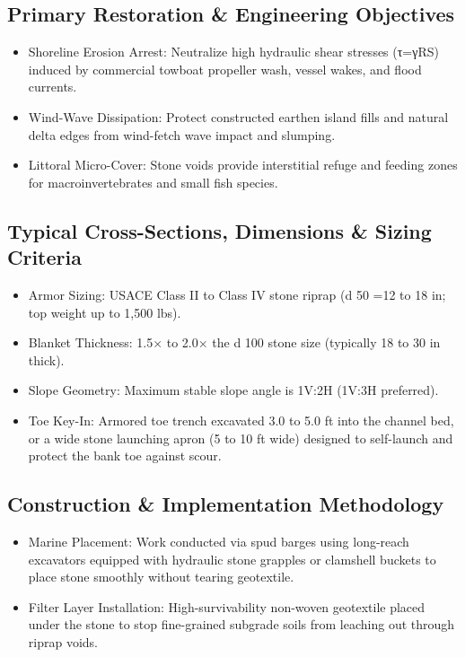 \documentclass[
  letterpaper,
  DIV=11,
  numbers=noendperiod]{scrreprt}
\begin{document}
\subsection{Primary Restoration \& Engineering
Objectives}\label{primary-restoration-engineering-objectives-10}

\begin{itemize}
\item
  Shoreline Erosion Arrest: Neutralize high hydraulic shear stresses
  (τ=γRS) induced by commercial towboat propeller wash, vessel wakes,
  and flood currents.
\item
  Wind-Wave Dissipation: Protect constructed earthen island fills and
  natural delta edges from wind-fetch wave impact and slumping.
\item
  Littoral Micro-Cover: Stone voids provide interstitial refuge and
  feeding zones for macroinvertebrates and small fish species.
\end{itemize}

\subsection{Typical Cross-Sections, Dimensions \& Sizing
Criteria}\label{typical-cross-sections-dimensions-sizing-criteria-8}

\begin{itemize}
\item
  Armor Sizing: USACE Class II to Class IV stone riprap (d 50 =12 to 18
  in; top weight up to 1,500 lbs).
\item
  Blanket Thickness: 1.5× to 2.0× the d 100 stone size (typically 18 to
  30 in thick).
\item
  Slope Geometry: Maximum stable slope angle is 1V:2H (1V:3H preferred).
\item
  Toe Key-In: Armored toe trench excavated 3.0 to 5.0 ft into the
  channel bed, or a wide stone launching apron (5 to 10 ft wide)
  designed to self-launch and protect the bank toe against scour.
\end{itemize}

\subsection{Construction \& Implementation
Methodology}\label{construction-implementation-methodology-11}

\begin{itemize}
\item
  Marine Placement: Work conducted via spud barges using long-reach
  excavators equipped with hydraulic stone grapples or clamshell buckets
  to place stone smoothly without tearing geotextile.
\item
  Filter Layer Installation: High-survivability non-woven geotextile
  placed under the stone to stop fine-grained subgrade soils from
  leaching out through riprap voids.
\end{itemize}
\end{document}
